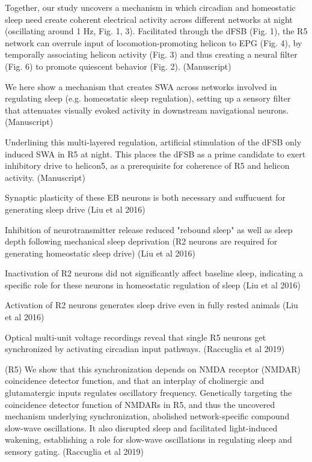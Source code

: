 Together, our study uncovers a mechanism in which circadian and homeostatic sleep need
create coherent electrical activity across different networks at night (oscillating around 1 Hz,
Fig. 1, 3). Facilitated through the dFSB (Fig. 1), the R5 network can overrule input of
locomotion-promoting helicon to EPG (Fig. 4), by temporally associating helicon activity (Fig.
3) and thus creating a neural filter (Fig. 6) to promote quiescent behavior (Fig. 2).
\parencite{raccugliaCoherentMultilevelNetwork2022} (Manuscript)

We here show
a mechanism that creates SWA across networks involved in regulating sleep (e.g. homeostatic
sleep regulation), setting up a sensory filter that attenuates visually evoked activity in
downstream navigational neurons.
\parencite{raccugliaCoherentMultilevelNetwork2022} (Manuscript)

Underlining this multi-layered regulation, artificial stimulation of the dFSB
only induced SWA in R5 at night. This places the dFSB as a prime candidate to exert inhibitory
drive to helicon5, as a prerequisite for coherence of R5 and helicon activity.
\parencite{raccugliaCoherentMultilevelNetwork2022} (Manuscript)

Synaptic plasticity of these EB neurons is both necessary and suffucuent for generating sleep drive \parencite{liuSleepDriveEncoded2016}
(Liu et al 2016)

Inhibition of neurotransmitter release reduced "rebound sleep" as well as sleep depth following mechanical sleep deprivation
(R2 neurons are required for generating homeostatic sleep drive) \parencite{liuSleepDriveEncoded2016}
(Liu et al 2016)

Inactivation of R2 neurons did not significantly affect baseline sleep, indicating a specific role for these neurons in
homeostatic regulation of sleep \parencite{liuSleepDriveEncoded2016}
(Liu et al 2016)

Activation of R2 neurons generates sleep drive even in fully rested animals \parencite{liuSleepDriveEncoded2016}
    (Liu et al 2016)


Optical multi-unit voltage recordings reveal that single R5 neurons get synchronized by activating circadian input pathways.
\parencite{raccugliaNetworkSpecificSynchronizationElectrical2019} (Raccuglia et al 2019)

(R5) We show that this synchronization depends on NMDA receptor (NMDAR) coincidence detector function, and that an interplay of cholinergic and glutamatergic inputs regulates oscillatory frequency.
Genetically targeting the coincidence detector function of NMDARs in R5, and thus the uncovered mechanism underlying synchronization, abolished network-specific compound slow-wave oscillations. It also disrupted sleep and facilitated light-induced wakening, establishing a role for slow-wave oscillations in regulating sleep and sensory gating.
\parencite{raccugliaNetworkSpecificSynchronizationElectrical2019} (Raccuglia et al 2019)


